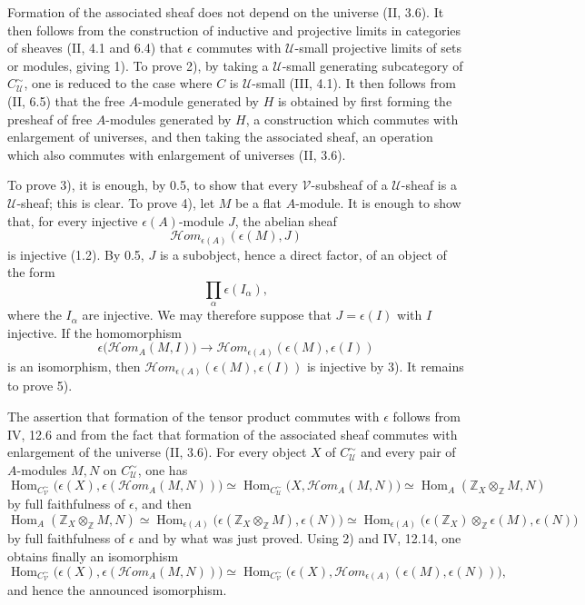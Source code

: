 \documentclass[11pt]{article}
\newcommand{\U}{\mathcal{U}}
\newcommand{\V}{\mathcal{V}}
\newcommand{\ZZ}{\mathbb Z}
\newcommand{\Hom}{\operatorname{Hom}}
\newcommand{\Hhom}{\mathcal{H}om}
\begin{document}
Formation of the associated sheaf does not depend on the universe (II, 3.6). It then follows from the construction of inductive and projective limits in categories of sheaves (II, 4.1 and 6.4) that $\epsilon$ commutes with $\U$-small projective limits of sets or modules, giving 1). To prove 2), by taking a $\U$-small generating subcategory of $C^\sim_\U$, one is reduced to the case where $C$ is $\U$-small (III, 4.1). It then follows from (II, 6.5) that the free $A$-module generated by $H$ is obtained by first forming the presheaf of free $A$-modules generated by $H$, a construction which commutes with enlargement of universes, and then taking the associated sheaf, an operation which also commutes with enlargement of universes (II, 3.6).

To prove 3), it is enough, by 0.5, to show that every $\V$-subsheaf of a $\U$-sheaf is a $\U$-sheaf; this is clear. To prove 4), let $M$ be a flat $A$-module. It is enough to show that, for every injective $\epsilon(A)$-module $J$, the abelian sheaf
\[
\Hhom_{\epsilon(A)}(\epsilon(M),J)
\]
is injective (1.2). By 0.5, $J$ is a subobject, hence a direct factor, of an object of the form
\[
\prod_\alpha \epsilon(I_\alpha),
\]
where the $I_\alpha$ are injective. We may therefore suppose that $J=\epsilon(I)$ with $I$ injective. If the homomorphism
\[
\epsilon\bigl(\Hhom_A(M,I)\bigr)
\longrightarrow
\Hhom_{\epsilon(A)}(\epsilon(M),\epsilon(I))
\]
is an isomorphism, then $\Hhom_{\epsilon(A)}(\epsilon(M),\epsilon(I))$ is injective by 3). It remains to prove 5).

The assertion that formation of the tensor product commutes with $\epsilon$ follows from IV, 12.6 and from the fact that formation of the associated sheaf commutes with enlargement of the universe (II, 3.6). For every object $X$ of $C^\sim_\U$ and every pair of $A$-modules $M,N$ on $C^\sim_\U$, one has
\[
\Hom_{C^\sim_\V}\bigl(\epsilon(X),\epsilon(\Hhom_A(M,N))\bigr)
\simeq
\Hom_{C^\sim_\U}\bigl(X,\Hhom_A(M,N)\bigr)
\simeq
\Hom_A(\ZZ_X\otimes_{\ZZ}M,N)
\]
by full faithfulness of $\epsilon$, and then
\[
\Hom_A(\ZZ_X\otimes_{\ZZ}M,N)
\simeq
\Hom_{\epsilon(A)}\bigl(\epsilon(\ZZ_X\otimes_{\ZZ}M),\epsilon(N)\bigr)
\simeq
\Hom_{\epsilon(A)}\bigl(\epsilon(\ZZ_X)\otimes_{\ZZ}\epsilon(M),\epsilon(N)\bigr)
\]
by full faithfulness of $\epsilon$ and by what was just proved. Using 2) and IV, 12.14, one obtains finally an isomorphism
\[
\Hom_{C^\sim_\V}\bigl(\epsilon(X),\epsilon(\Hhom_A(M,N))\bigr)
\simeq
\Hom_{C^\sim_\V}\bigl(\epsilon(X),
\Hhom_{\epsilon(A)}(\epsilon(M),\epsilon(N))\bigr),
\]
and hence the announced isomorphism.
\end{document}
